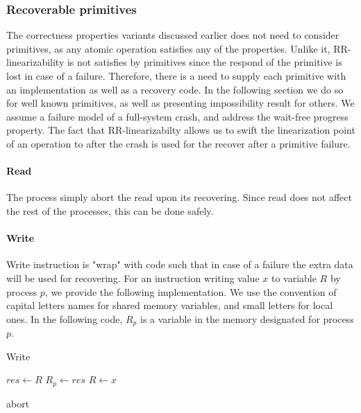 \documentclass{article}
\begin{document}
\subsubsection*{Recoverable primitives}

The correctness properties variants discussed earlier does not need to consider primitives, as any atomic operation satisfies any of the properties. Unlike it, RR-linearizability is not satisfies by primitives since the respond of the primitive is lost in case of a failure. Therefore, there is a need to supply each primitive with an implementation as well as a recovery code. In the following section we do so for well known primitives, as well as presenting impossibility result for others. We assume a failure model of a full-system crash, and address the wait-free progress property.
The fact that RR-linearizabilty allows us to swift the linearization point of an operation to after the crash is used for the recover after a primitive failure.

\paragraph*{Read}

The process simply abort the read upon its recovering. Since read does not affect the rest of the processes, this can be done safely.

\paragraph*{Write}
Write instruction is "wrap" with code such that in case of a failure the extra data will be used for recovering. For an instruction writing value $x$ to variable $R$ by process $p$, we provide the following implementation. We use the convention of capital letters names for shared memory variables, and small letters for local ones. In the following code, $R_p$ is a variable in the memory designated for process $p$.

\begin{algorithm}
	\caption{Write}\label{euclid}
	\begin{algorithmic}[1]
		\State $res \gets R$
		\State $R_{p} \gets res$
		\State $R \gets x$
		\EndProcedure
		
		 \Return abort
		\EndIf
		\EndProcedure
	\end{algorithmic}
\end{algorithm}
\end{document}
